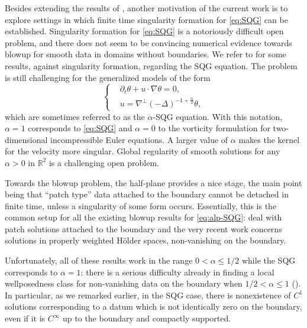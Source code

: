 \documentclass[10pt]{amsart}
\theoremstyle{definition}
\theoremstyle{remark}
\numberwithin{equation}{section}
\newcommand{\lap}{\Delta}
\newcommand{\rd}{\partial}
\newcommand{\nb}{\nabla}
\newcommand{\0}{\emptyset}
\newcommand{\alp}{\alpha}
\newcommand{\tht}{\theta}
\newcommand{\bbR}{\mathbb R}
\begin{document}
	Besides extending the results of \cite{CNgu}, another motivation of the current work is to explore settings in which finite time singularity formation for \eqref{eq:SQG} can be established. Singularity formation for \eqref{eq:SQG} is a notoriously difficult open problem, and there does not seem to be convincing numerical evidence towards blowup for smooth data in domains without boundaries. We refer to \cite{CGI,Cor-hyp,CCGM,CCZ,EJ1,HH-sqg,HMsqg,HuShuZha} for some results, against singularity formation, regarding the SQG equation. The problem is still challenging for the generalized models of the form \begin{equation}  \label{eq:alp-SQG} 
		\left\{
		\begin{aligned} 
			&\rd_t\tht + u\cdot \nb \tht = 0, \\
			&u=  \nb^\perp (-\lap)^{-1 + \frac{\alp}{2} } \tht,
		\end{aligned}
		\right. 
	\end{equation} which are sometimes referred to as the $\alp$-SQG equation. With this notation, $\alp = 1$ corresponds to \eqref{eq:SQG} and $\alp = 0$ to the vorticity formulation for two-dimensional incompressible Euler equations. A larger value of $\alp$ makes the kernel for the velocity more singular. Global regularity of smooth solutions for any $\alp>0$ in $\bbR^{2}$ is a challenging open problem. 
	
	Towards the blowup problem, the half-plane provides a nice stage, the main point being that ``patch type'' data attached to the boundary cannot be detached in finite time, unless a singularity of some form occurs. Essentially, this is the common setup for all the existing blowup results for \eqref{eq:alp-SQG}: \cite{KRYZ,KYZ,GaPa,MTXX} deal with patch solutions attached to the boundary and the very recent work \cite{Z2} concerns solutions in properly weighted H\"older spaces, non-vanishing on the boundary. 
	
	
	Unfortunately, all of these results work in the range $0<\alp\le1/2$ while the SQG corresponds to $\alp=1$: there is a serious difficulty already in finding a local wellposedness class for non-vanishing data on the boundary when $1/2<\alp\le1$ (\cite{Z2,JKY}). In particular, as we remarked earlier, in the SQG case, there is nonexistence of $C^1$ solutions corresponding to a datum which is not identically zero on the boundary, even if it is $C^{\infty}$ up to the boundary and compactly supported. 
	
\end{document}
